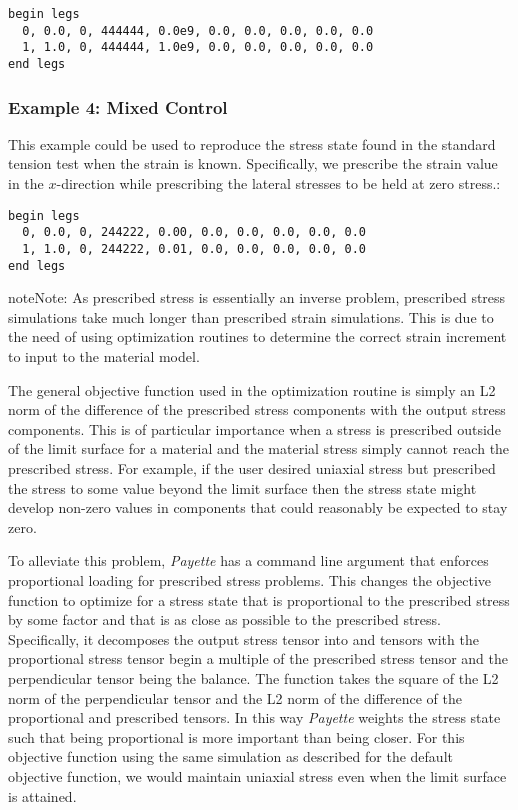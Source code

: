 \documentclass[letterpaper,10pt,english]{sphinxmanual}
\begin{document}
\begin{Verbatim}[commandchars=\\\{\}]
begin legs
  0, 0.0, 0, 444444, 0.0e9, 0.0, 0.0, 0.0, 0.0, 0.0
  1, 1.0, 0, 444444, 1.0e9, 0.0, 0.0, 0.0, 0.0, 0.0
end legs
\end{Verbatim}


\subsubsection{Example 4: Mixed Control}
\label{Files/input_file_formatting:example-4-mixed-control}\label{Files/input_file_formatting:example-4}
This example could be used to reproduce the stress state found in the standard
tension test when the strain is known. Specifically, we prescribe the strain
value in the $x$-direction while prescribing the lateral stresses to be
held at zero stress.:

\begin{Verbatim}[commandchars=\\\{\}]
begin legs
  0, 0.0, 0, 244222, 0.00, 0.0, 0.0, 0.0, 0.0, 0.0
  1, 1.0, 0, 244222, 0.01, 0.0, 0.0, 0.0, 0.0, 0.0
end legs
\end{Verbatim}

\begin{notice}{note}{Note:}
As prescribed stress is essentially an inverse problem, prescribed stress
simulations take much longer than prescribed strain simulations. This is due
to the need of using optimization routines to determine the correct strain
increment to input to the material model.

The general objective function used in the optimization routine is simply an
L2 norm of the difference of the prescribed stress components with the output
stress components. This is of particular importance when a stress is
prescribed outside of the limit surface for a material and the material stress
simply cannot reach the prescribed stress. For example, if the user desired
uniaxial stress but prescribed the stress to some value beyond the limit
surface then the stress state might develop non-zero values in components that
could reasonably be expected to stay zero.

To alleviate this problem, \emph{Payette} has a command line argument
 that enforces proportional loading for prescribed stress
problems. This changes the objective function to optimize for a stress state
that is proportional to the prescribed stress by some factor and that is as
close as possible to the prescribed stress. Specifically, it decomposes the
output stress tensor into  and  tensors with
the proportional stress tensor begin a multiple of the prescribed stress
tensor and the perpendicular tensor being the balance. The function takes the
square of the L2 norm of the perpendicular tensor and the L2 norm of the
difference of the proportional and prescribed tensors. In this way \emph{Payette}
weights the stress state such that being proportional is more important than
being closer. For this objective function using the same simulation as
described for the default objective function, we would maintain uniaxial
stress even when the limit surface is attained.
\end{notice}
\end{document}
